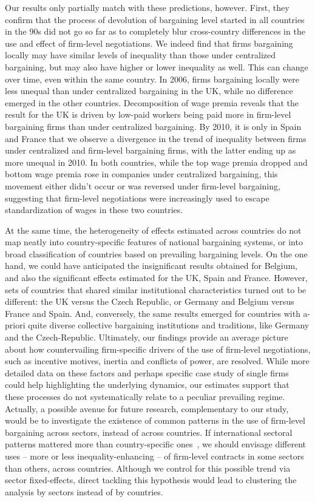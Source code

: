 \documentclass[Review,times,sageh,11pt]{sagej}
\begin{document}
Our results only partially match with these predictions, however. First, they confirm that the process of devolution of bargaining level started in all countries in the 90s did not go so far as to completely blur cross-country differences in the use and effect of firm-level negotiations. We indeed find that firms bargaining locally may have similar levels of inequality than those under centralized bargaining, but may also have higher or lower inequality as well. This can change over time, even within the same country. In 2006, firms bargaining locally were less unequal than under centralized bargaining in the UK, while no difference emerged in the other countries. Decomposition of wage premia reveals that the result for the UK is driven by low-paid workers being paid more in firm-level bargaining firms than under centralized bargaining. By 2010, it is only in Spain and France that we observe a divergence in the trend of inequality between firms under centralized and firm-level bargaining firms, with the latter ending up as more unequal in 2010. In both countries, while the top wage premia dropped and bottom wage premia rose in companies under centralized bargaining, this movement either didn't occur or was reversed under firm-level bargaining, suggesting that firm-level negotiations were increasingly used to escape standardization of wages in these two countries. 

At the same time, the heterogeneity of effects estimated across countries do not map neatly into country-specific features of national bargaining systems, or into broad classification of countries based on prevailing bargaining levels. On the one hand, we could have anticipated the insignificant results obtained for Belgium, and also the significant effects estimated for the UK, Spain and France. However, sets of countries that shared similar institutional characteristics turned out to be different: the UK versus the Czech Republic, or Germany and Belgium versus France and Spain. And, conversely, the same results emerged for countries with a-priori quite diverse collective bargaining institutions and traditions, like Germany and the Czech-Republic. Ultimately, our findings provide an average picture about how countervailing firm-specific drivers of the use of firm-level negotiations, such as incentive motives, inertia and conflicts of power, are resolved. While more detailed data on these factors and perhaps specific case study of single firms could help highlighting the underlying dynamics, our estimates support that these processes do not systematically relate to a peculiar prevailing regime. Actually, a possible avenue for future research, complementary to our study, would be to investigate the existence of common patterns in the use of firm-level bargaining across sectors, instead of across countries. If international sectoral patterns mattered more than country-specific ones~\citep[as suggested in ][]{bechter2012sectors}, we should envisage different uses -- more or less inequality-enhancing -- of firm-level contracts in some sectors than others, across countries. Although we control for this possible trend via sector fixed-effects, direct tackling this hypothesis would lead to clustering the analysis by sectors instead of by countries. 
\end{document}
